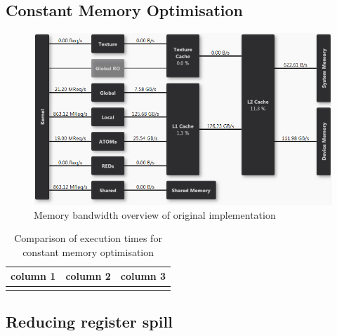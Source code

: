 \documentclass[11pt, oneside, a4paper]{article}
\begin{document}

\subsection{Constant Memory Optimisation} %
\label{sub:constant_memory_optimisation}

\begin{figure}[tb]
	\begin{center}
		\includegraphics[width=\textwidth]{"Original nonconst LHS memory overview BW"}
	\end{center}
	\caption{Memory bandwidth overview of original implementation}
	\label{fig:membBWorig}
\end{figure}

\begin{table}[tb]
	\caption{Comparison of execution times for constant memory optimisation}
	\label{tab:constMemExeTime}
	\begin{center}
		\begin{tabular}{l|cc}
		\hline

		\hline
		\textbf{column 1} & \textbf{column 2} & \textbf{column 3} \\
		\hline
			 & & \\
		\hline

		\hline
		\end{tabular}
	\end{center}
\end{table}


\subsection{Reducing register spill} %
\label{sub:reducing_register_spill}
\end{document}
